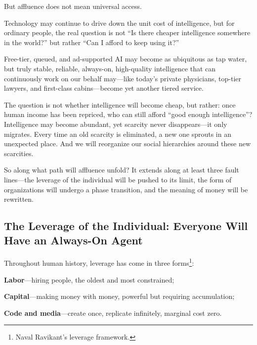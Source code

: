 \vspace{1em}

But affluence does not mean universal access.

Technology may continue to drive down the unit cost of intelligence, but for ordinary people, the real question is not ``Is there cheaper intelligence somewhere in the world?'' but rather ``Can I afford to keep using it?''

\vspace{1em}

Free-tier, queued, and ad-supported AI may become as ubiquitous as tap water, but truly stable, reliable, always-on, high-quality intelligence that can continuously work on our behalf may---like today's private physicians, top-tier lawyers, and first-class cabins---become yet another tiered service.

\vspace{1em}

The question is not whether intelligence will become cheap, but rather: once human income has been repriced, who can still afford ``good enough intelligence''?
Intelligence may become abundant, yet scarcity never disappears---it only migrates. Every time an old scarcity is eliminated, a new one sprouts in an unexpected place. And we will reorganize our social hierarchies around these new scarcities.

\vspace{1em}

So along what path will affluence unfold?
It extends along at least three fault lines---the leverage of the individual will be pushed to its limit, the form of organizations will undergo a phase transition, and the meaning of money will be rewritten.

\newpage
\subsection{The Leverage of the Individual: Everyone Will Have an Always-On Agent}

Throughout human history, leverage has come in three forms\footnote{Naval Ravikant's leverage framework.}:

\textbf{Labor}---hiring people, the oldest and most constrained;

\textbf{Capital}---making money with money, powerful but requiring accumulation;

\textbf{Code and media}---create once, replicate infinitely, marginal cost zero.

